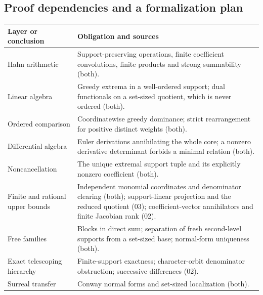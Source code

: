 \documentclass[11pt,letterpaper]{article}
\numberwithin{equation}{section}
\theoremstyle{definition}
\theoremstyle{remark}
\begin{document}
\subsection{Proof dependencies and a formalization plan}
\label{adr:sr:sec:dependencies}

\begin{center}\small
\begin{tabularx}{\textwidth}{@{}P{0.30\textwidth}Y@{}}
\toprule
Layer or conclusion & Obligation and sources\\
\midrule
Hahn arithmetic & Support-preserving operations, finite coefficient
convolutions, finite products and strong summability (both).\\
Linear algebra & Greedy extrema in a well-ordered support; dual functionals on
a set-sized quotient, which is never ordered (both).\\
Ordered comparison & Coordinatewise greedy dominance; strict rearrangement for
positive distinct weights (both).\\
Differential algebra & Euler derivations annihilating the whole core; a
nonzero derivative determinant forbids a minimal relation (both).\\
Noncancellation & The unique extremal support tuple and its explicitly nonzero
coefficient (both).\\
Finite and rational upper bounds & Independent monomial coordinates and
denominator clearing (both); support-linear projection and the reduced
quotient (03); coefficient-vector annihilators and finite Jacobian rank (02).\\
Free families & Blocks in direct sum; separation of fresh second-level
supports from a set-sized base; normal-form uniqueness (both).\\
Exact telescoping hierarchy & Finite-support exactness; character-orbit
denominator obstruction; successive differences (02).\\
Surreal transfer & Conway normal forms and set-sized localization (both).\\
\bottomrule
\end{tabularx}
\end{center}
\end{document}
